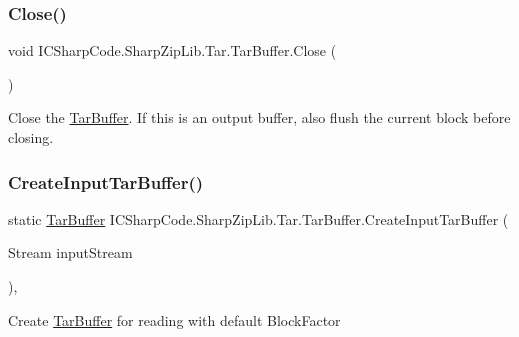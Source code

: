 \subsubsection{\texorpdfstring{Close()}{Close()}}
{\footnotesize\ttfamily void I\+C\+Sharp\+Code.\+Sharp\+Zip\+Lib.\+Tar.\+Tar\+Buffer.\+Close (\begin{DoxyParamCaption}{ }\end{DoxyParamCaption})\hspace{0.3cm}{\ttfamily [inline]}}



Close the \hyperlink{class_i_c_sharp_code_1_1_sharp_zip_lib_1_1_tar_1_1_tar_buffer}{Tar\+Buffer}. If this is an output buffer, also flush the current block before closing. 

\mbox{\label{class_i_c_sharp_code_1_1_sharp_zip_lib_1_1_tar_1_1_tar_buffer_ac0e1b010972b90d39c6c10df8bdae0ee}} 
\subsubsection{\texorpdfstring{Create\+Input\+Tar\+Buffer()}{CreateInputTarBuffer()}\hspace{0.1cm}{\footnotesize\ttfamily [1/2]}}
{\footnotesize\ttfamily static \hyperlink{class_i_c_sharp_code_1_1_sharp_zip_lib_1_1_tar_1_1_tar_buffer}{Tar\+Buffer} I\+C\+Sharp\+Code.\+Sharp\+Zip\+Lib.\+Tar.\+Tar\+Buffer.\+Create\+Input\+Tar\+Buffer (\begin{DoxyParamCaption}\item[{Stream}]{input\+Stream }\end{DoxyParamCaption})\hspace{0.3cm}{\ttfamily [inline]}, {\ttfamily [static]}}



Create \hyperlink{class_i_c_sharp_code_1_1_sharp_zip_lib_1_1_tar_1_1_tar_buffer}{Tar\+Buffer} for reading with default Block\+Factor 


